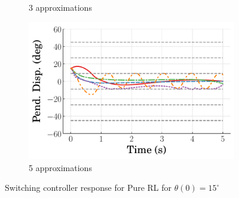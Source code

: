 \begin{figure}[tb]
\begin{subfigure}[b]{0.32\textwidth}
        \caption{3 approximations}
        \label{subfig_chap5:pure_RL_near_equil_15_3_bins_resp_unclipped}
    \end{subfigure}
    \hfill
    \begin{subfigure}[b]{0.32\textwidth}
        \centering
        \includegraphics[width=\textwidth]{figures/figures_Interpretability/Mean_ISE_Inverted_Pendulum-v0_cubic_5_bins_near_equil/Curve_fit_time_responses/pure_RL/curve_fit_Pend_Disp_15.pdf}
        \caption{5 approximations}
        \label{subfig_chap5:pure_RL_near_equil_15_5_bins_resp_unclipped}
    \end{subfigure}
    \caption{Switching controller response for Pure RL for $\theta(0)=15^\circ$}
    \label{fig_chap5:pure_RL_near_equil_15_resp_unclipped}
\end{figure}
%

